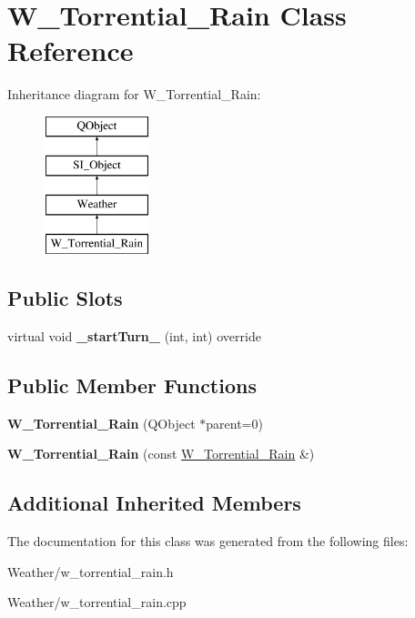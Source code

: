\hypertarget{class_w___torrential___rain}{}\section{W\+\_\+\+Torrential\+\_\+\+Rain Class Reference}
\label{class_w___torrential___rain}
Inheritance diagram for W\+\_\+\+Torrential\+\_\+\+Rain\+:\begin{figure}[H]
\begin{center}
\leavevmode
\includegraphics[height=4.000000cm]{class_w___torrential___rain}
\end{center}
\end{figure}
\subsection*{Public Slots}
\begin{DoxyCompactItemize}
\item 
\mbox{\label{class_w___torrential___rain_a642f4d63abe119722d718fc3ade661e3}} 
virtual void {\bfseries \+\_\+start\+Turn\+\_\+} (int, int) override
\end{DoxyCompactItemize}
\subsection*{Public Member Functions}
\begin{DoxyCompactItemize}
\item 
\mbox{\label{class_w___torrential___rain_a0c8d580adb36d4c88563a533086e7a95}} 
{\bfseries W\+\_\+\+Torrential\+\_\+\+Rain} (Q\+Object $\ast$parent=0)
\item 
\mbox{\label{class_w___torrential___rain_aac666f488100828a0387d8fbc4474728}} 
{\bfseries W\+\_\+\+Torrential\+\_\+\+Rain} (const \hyperlink{class_w___torrential___rain}{W\+\_\+\+Torrential\+\_\+\+Rain} \&)
\end{DoxyCompactItemize}
\subsection*{Additional Inherited Members}


The documentation for this class was generated from the following files\+:\begin{DoxyCompactItemize}
\item 
Weather/w\+\_\+torrential\+\_\+rain.\+h\item 
Weather/w\+\_\+torrential\+\_\+rain.\+cpp\end{DoxyCompactItemize}
